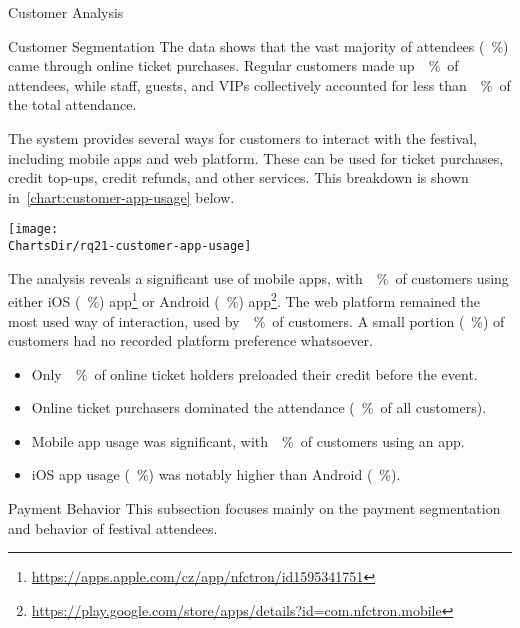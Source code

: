 \begin{section}{Customer Analysis}
\begin{subsection}{Customer Segmentation}
		The data shows that the vast majority of attendees (~\%) came through online ticket purchases.
		Regular customers made up~~\%~of attendees, while staff, guests, and VIPs collectively accounted for less than~~\%~of the total attendance.


		The system provides several ways for customers to interact with the festival, including mobile apps and web platform.
		These can be used for ticket purchases, credit top-ups, credit refunds, and other services.
		This breakdown is shown in~\autoref{chart:customer-app-usage} below.

		\begin{chart}[h]
			\centering
			\texttt{[image: \\ChartsDir/rq21-customer-app-usage]}
			\caption{ Customer App Usage}
			\label{chart:customer-app-usage}
			\source
		\end{chart}

		The analysis reveals a significant use of mobile apps, with~~\%~of customers using either iOS (~\%) app\footnote{\url{https://apps.apple.com/cz/app/nfctron/id1595341751}}
		or Android (~\%) app\footnote{\url{https://play.google.com/store/apps/details?id=com.nfctron.mobile}}.
		The web platform remained the most used way of interaction, used by~~\%~of customers.
		A small portion (~\%) of customers had no recorded platform preference whatsoever.

		\begin{keytakeaways}
			\begin{itemize}
				\item Only~~\%~of online ticket holders preloaded their credit before the event.
				\item Online ticket purchasers dominated the attendance (~\%~of all customers).
				\item Mobile app usage was significant, with~~\%~of customers using an app.
				\item iOS app usage (~\%) was notably higher than Android (~\%).
			\end{itemize}
		\end{keytakeaways}
	\end{subsection}


	\begin{subsection}{Payment Behavior}
		\label{subsec:analysis-customer-payment-behavior}
		This subsection focuses mainly on the payment segmentation and behavior of festival attendees.


\end{subsection}
\end{section}
